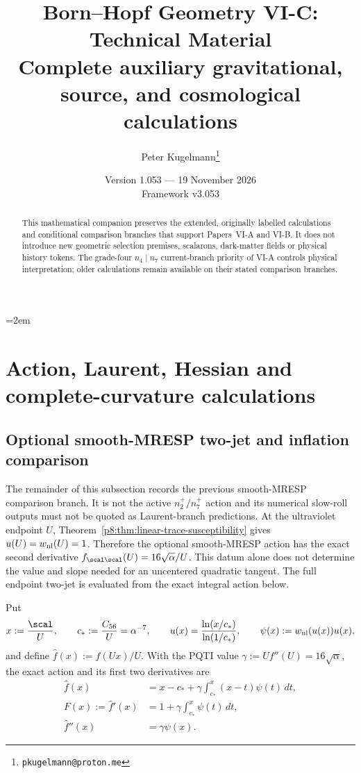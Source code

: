\documentclass[12pt,a4paper]{article}
\title{\textbf{Born--Hopf Geometry VI-C: Technical Material}\\[0.5em]
\large Complete auxiliary gravitational, source, and cosmological calculations}
\author{Peter Kugelmann\thanks{\texttt{pkugelmann@proton.me}}}
\date{Version 1.053 --- 19 November 2026 \\ Framework v3.053}
\begin{document}
\emergencystretch=2em
\maketitle
\begin{abstract}
This mathematical companion preserves the extended, originally labelled
calculations and conditional comparison branches that support Papers~VI-A and
VI-B. It does not introduce new geometric selection premises, scalarons,
dark-matter fields or physical history tokens. The grade-four $n_4\mid n_7$
current-branch priority of VI-A controls physical interpretation; older
calculations remain available on their stated comparison branches.
\end{abstract}
\tableofcontents
\clearpage

\section{Action, Laurent, Hessian and complete-curvature calculations}
\label{p6c:sec:c1}
\subsection{Optional smooth-MRESP two-jet and inflation comparison}
\label{p8:sec:starobinsky}

The remainder of this subsection records the previous smooth-MRESP
comparison branch.  It is not the active \(n_2^+/n_7^+\) action and its numerical
slow-roll outputs must not be quoted as Laurent-branch predictions.
At the ultraviolet endpoint \(U\), Theorem~\ref{p8:thm:linear-trace-susceptibility}
gives \(u(U)=w_{\rm nl}(U)=1\).  Therefore the optional smooth-MRESP action has the
exact second derivative
\(f_{\scal\scal}(U)=16\sqrt\alpha/U\).  This datum alone does not determine
the value and slope needed for an uncentered quadratic tangent.  The full
endpoint two-jet is evaluated from the exact integral action below.

Put
\begin{equation}
\label{p8:eq:smooth-inflation-xu}
 x:=\frac{\scal}{U},\qquad c_*:=\frac{C_{56}}U=\alpha^{-7},\qquad
 u(x)=\frac{\ln(x/c_*)}{\ln(1/c_*)},\qquad
 \psi(x):=w_{\rm nl}(u(x))u(x),
\end{equation}
and define \(\widehat f(x):=f(Ux)/U\).  With the PQTI value
\(\gamma:=Uf''(U)=16\sqrt\alpha\), the exact action and its first two
derivatives are
\begin{align}
\label{p8:eq:exact-smooth-fhat}
\widehat f(x)
 &=x-c_*+\gamma\int_{c_*}^{x}(x-t)\psi(t)\,dt,\\
F(x):=\widehat f'(x)
 &=1+\gamma\int_{c_*}^{x}\psi(t)\,dt,\\
\widehat f''(x)&=\gamma\psi(x).
\end{align}
\end{document}
